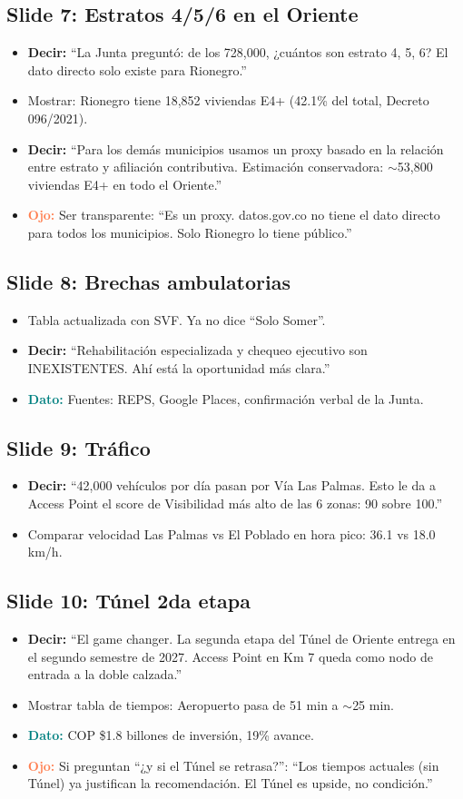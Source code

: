 \documentclass[11pt, a4paper]{article}
\newcommand{\slide}[2]{\subsection{Slide #1: #2}}
\newcommand{\say}[1]{\textcolor{hptu}{\textbf{Decir:}} ``#1''}
\newcommand{\dato}[1]{\textcolor{teal}{\textbf{Dato:}} #1}
\newcommand{\warn}[1]{\textcolor{coral}{\textbf{Ojo:}} #1}
\begin{document}
\slide{7}{Estratos 4/5/6 en el Oriente}
\begin{itemize}[leftmargin=1cm]
  \item \say{La Junta preguntó: de los 728,000, ¿cuántos son estrato 4, 5, 6? El dato directo solo existe para Rionegro.}
  \item Mostrar: Rionegro tiene 18,852 viviendas E4+ (42.1\% del total, Decreto 096/2021).
  \item \say{Para los demás municipios usamos un proxy basado en la relación entre estrato y afiliación contributiva. Estimación conservadora: $\sim$53,800 viviendas E4+ en todo el Oriente.}
  \item \warn{Ser transparente: ``Es un proxy. datos.gov.co no tiene el dato directo para todos los municipios. Solo Rionegro lo tiene público.''}
\end{itemize}

\slide{8}{Brechas ambulatorias}
\begin{itemize}[leftmargin=1cm]
  \item Tabla actualizada con SVF. Ya no dice ``Solo Somer''.
  \item \say{Rehabilitación especializada y chequeo ejecutivo son INEXISTENTES. Ahí está la oportunidad más clara.}
  \item \dato{Fuentes: REPS, Google Places, confirmación verbal de la Junta.}
\end{itemize}

\slide{9}{Tráfico}
\begin{itemize}[leftmargin=1cm]
  \item \say{42,000 vehículos por día pasan por Vía Las Palmas. Esto le da a Access Point el score de Visibilidad más alto de las 6 zonas: 90 sobre 100.}
  \item Comparar velocidad Las Palmas vs El Poblado en hora pico: 36.1 vs 18.0 km/h.
\end{itemize}

\slide{10}{Túnel 2da etapa}
\begin{itemize}[leftmargin=1cm]
  \item \say{El game changer. La segunda etapa del Túnel de Oriente entrega en el segundo semestre de 2027. Access Point en Km 7 queda como nodo de entrada a la doble calzada.}
  \item Mostrar tabla de tiempos: Aeropuerto pasa de 51 min a $\sim$25 min.
  \item \dato{COP \$1.8 billones de inversión, 19\% avance.}
  \item \warn{Si preguntan ``¿y si el Túnel se retrasa?'': ``Los tiempos actuales (sin Túnel) ya justifican la recomendación. El Túnel es upside, no condición.''}
\end{itemize}
\end{document}
